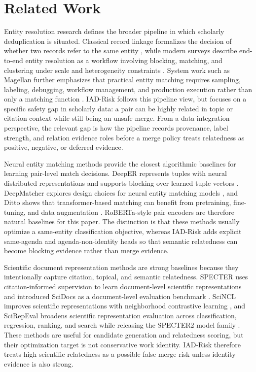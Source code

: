 \documentclass[11pt]{article}
\begin{document}
\section{Related Work}

Entity resolution research defines the broader pipeline in which scholarly deduplication is situated. Classical record linkage formalizes the decision of whether two records refer to the same entity \citep{fellegi1969record}, while modern surveys describe end-to-end entity resolution as a workflow involving blocking, matching, and clustering under scale and heterogeneity constraints \citep{christophides2020endtoend}. System work such as Magellan further emphasizes that practical entity matching requires sampling, labeling, debugging, workflow management, and production execution rather than only a matching function \citep{konda2016magellan}. IAD-Risk follows this pipeline view, but focuses on a specific safety gap in scholarly data: a pair can be highly related in topic or citation context while still being an unsafe merge. From a data-integration perspective, the relevant gap is how the pipeline records provenance, label strength, and relation evidence roles before a merge policy treats relatedness as positive, negative, or deferred evidence.

Neural entity matching methods provide the closest algorithmic baselines for learning pair-level match decisions. DeepER represents tuples with neural distributed representations and supports blocking over learned tuple vectors \citep{ebraheem2018deeper}. DeepMatcher explores design choices for neural entity matching models \citep{mudgal2018deep}, and Ditto shows that transformer-based matching can benefit from pretraining, fine-tuning, and data augmentation \citep{li2020ditto}. RoBERTa-style pair encoders \citep{liu2019roberta} are therefore natural baselines for this paper. The distinction is that these methods usually optimize a same-entity classification objective, whereas IAD-Risk adds explicit same-agenda and agenda-non-identity heads so that semantic relatedness can become blocking evidence rather than merge evidence.

Scientific document representation methods are strong baselines because they intentionally capture citation, topical, and semantic relatedness. SPECTER uses citation-informed supervision to learn document-level scientific representations and introduced SciDocs as a document-level evaluation benchmark \citep{cohan2020specter}. SciNCL improves scientific representations with neighborhood contrastive learning \citep{ostendorff2022scincl}, and SciRepEval broadens scientific representation evaluation across classification, regression, ranking, and search while releasing the SPECTER2 model family \citep{singh2022scirepeval}. These methods are useful for candidate generation and relatedness scoring, but their optimization target is not conservative work identity. IAD-Risk therefore treats high scientific relatedness as a possible false-merge risk unless identity evidence is also strong.
\end{document}
